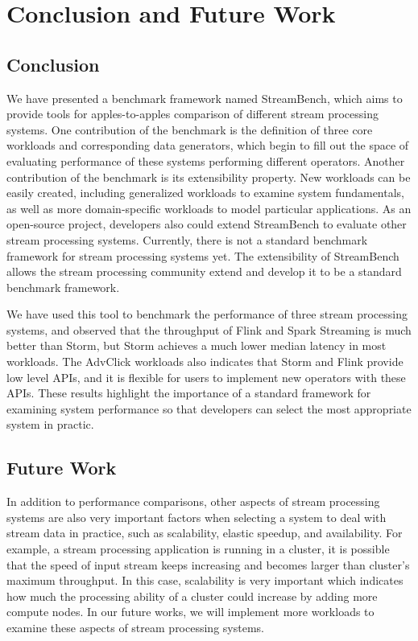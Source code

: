 \chapter{Conclusion and Future Work}

\section{Conclusion}

We have presented a benchmark framework named StreamBench, which aims to provide tools for apples-to-apples comparison of different stream processing systems. One contribution of the benchmark is the definition of three core workloads and corresponding data generators, which begin to fill out the space of evaluating performance of these systems performing different operators. Another contribution of the benchmark is its extensibility property. New workloads can be easily created, including generalized workloads to examine system fundamentals, as well as more domain-specific workloads to model particular applications. As an open-source project, developers also could extend StreamBench to evaluate other stream processing systems. Currently, there is not a standard benchmark framework for stream processing systems yet. The extensibility of StreamBench allows the stream processing community extend and develop it to be a standard benchmark framework. 

We have used this tool to benchmark the performance of three stream processing systems, and observed that the throughput of Flink and Spark Streaming is much better than Storm, but Storm achieves a much lower median latency in most workloads. The AdvClick workloads also indicates that Storm and Flink provide low level APIs, and it is flexible for users to implement new operators with these APIs. These results highlight the importance of a standard framework for examining system performance so that developers can select the most appropriate system in practic.

\section{Future Work}

In addition to performance comparisons, other aspects of stream processing systems are also very important factors when selecting a system to deal with stream data in practice, such as scalability, elastic speedup, and availability. For example, a stream processing application is running in a cluster, it is possible that the speed of input stream keeps increasing and becomes larger than cluster's maximum throughput. In this case, scalability is very important which indicates how much the processing ability of a cluster could increase by adding more compute nodes. In our future works, we will implement more workloads to examine these aspects of stream processing systems.

